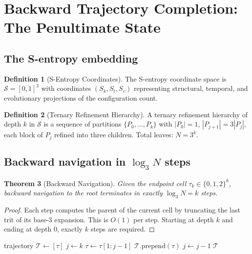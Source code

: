 \documentclass[twocolumn,10pt,a4paper]{article}
\theoremstyle{thmstyle}
\newtheorem{theorem}{Theorem}[section]
\theoremstyle{definition}
\newtheorem{definition}[theorem]{Definition}
\theoremstyle{remark}
\newcommand{\Sspace}{\mathcal{S}}
\begin{document}
\section{Backward Trajectory Completion: The Penultimate State}
\label{sec:backward}

\subsection{The S-entropy embedding}

\begin{definition}[S-Entropy Coordinates]
\label{def:Sspace}
The S-entropy coordinate space is $\Sspace=[0,1]^{3}$ with coordinates
$(S_{k},S_{t},S_{e})$ representing structural, temporal, and
evolutionary projections of the configuration count.
\end{definition}

\begin{definition}[Ternary Refinement Hierarchy]
\label{def:hier}
A ternary refinement hierarchy of depth $k$ in $\Sspace$ is a sequence
of partitions $\{P_{0},\ldots,P_{k}\}$ with $|P_{0}|=1$,
$|P_{j+1}|=3|P_{j}|$, each block of $P_{j}$ refined into three
children. Total leaves: $N=3^{k}$.
\end{definition}

\subsection{Backward navigation in $\log_{3}N$ steps}

\begin{theorem}[Backward Navigation]
\label{thm:logn}
Given the endpoint cell $\tau_{k}\in\{0,1,2\}^{k}$, backward navigation
to the root terminates in exactly $\log_{3}N=k$ steps.
\end{theorem}

\begin{proof}
Each step computes the parent of the current cell by truncating the
last trit of its base-3 expansion. This is $O(1)$ per step. Starting
at depth $k$ and ending at depth $0$, exactly $k$ steps are required.
\end{proof}

\begin{algorithm}[!htbp]
\caption{Backward Trajectory Completion}
\label{alg:back}
\begin{algorithmic}[1]
\State trajectory $\mathcal{T}\gets[\tau]$
\State $j\gets k$
\State $\tau\gets\tau[1{:}j-1]$
\State $\mathcal{T}.\mathrm{prepend}(\tau)$
\State $j\gets j-1$
\EndWhile
\State \Return $\mathcal{T}$
\EndFunction
\end{algorithmic}
\end{algorithm}
\end{document}
